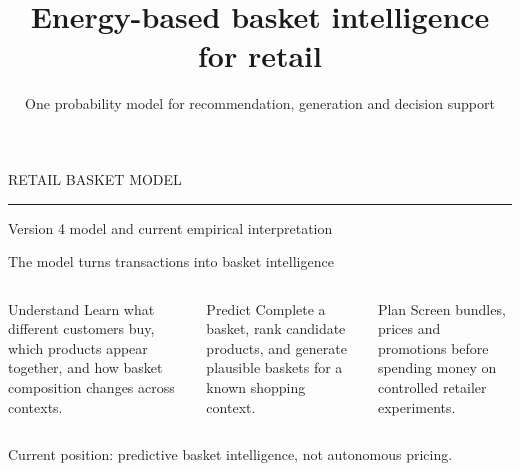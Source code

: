 \documentclass[aspectratio=169,11pt,t]{beamer}
\title{Energy-based basket intelligence for retail}
\subtitle{One probability model for recommendation, generation and decision support}
\author{}
\date{}
\newcommand{\blue}[1]{\textcolor{Accent}{#1}}
\begin{document}
\begin{frame}[plain]
  \vspace{1.2cm}
  {\color{Accent}\large RETAIL BASKET MODEL}\par
  \vspace{0.8cm}
  {\inserttitle\par}
  \vspace{0.45cm}
  {\color{Muted}\insertsubtitle\par}
  \vfill
  {\color{Rule}\rule{0.46\textwidth}{0.8pt}}\par
  \vspace{0.22cm}
  {\small\color{Muted}Version 4 model and current empirical interpretation}
\end{frame}

\begin{frame}{The model turns transactions into basket intelligence}
\begin{columns}[T,onlytextwidth]
  \begin{block}{Understand}
  Learn what different customers buy, which products appear together, and how basket
  composition changes across contexts.
  \end{block}

  \begin{block}{Predict}
  Complete a basket, rank candidate products, and generate plausible baskets for a known
  shopping context.
  \end{block}

  \begin{block}{Plan}
  Screen bundles, prices and promotions before spending money on controlled retailer
  experiments.
  \end{block}
\end{columns}

\vspace{0.22cm}
\begin{center}
\large\blue{Current position: predictive basket intelligence, not autonomous pricing.}
\end{center}
\end{frame}
\end{document}
